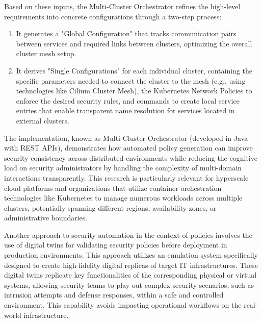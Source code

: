 Based on these inputs, the Multi-Cluster Orchestrator refines the high-level requirements into concrete configurations through a two-step process\cite{bringhenti_security_2023}:
\begin{enumerate}
    \item It generates a "Global Configuration" that tracks communication pairs between services and required links between clusters, optimizing the overall cluster mesh setup\cite{bringhenti_security_2023}.
    \item It derives "Single Configurations" for each individual cluster, containing the specific parameters needed to connect the cluster to the mesh (e.g., using technologies like Cilium Cluster Mesh), the Kubernetes Network Policies to enforce the desired security rules, and commands to create local service entries that enable transparent name resolution for services located in external clusters\cite{bringhenti_security_2023}.
\end{enumerate}

The implementation, known as Multi-Cluster Orchestrator (developed in Java with REST APIs), demonstrates how automated policy generation can improve security consistency across distributed environments while reducing the cognitive load on security administrators by handling the complexity of multi-domain interactions transparently\cite{bringhenti_security_2023}. This research is particularly relevant for hyperscale cloud platforms and organizations that utilize container orchestration technologies like Kubernetes to manage numerous workloads across multiple clusters, potentially spanning different regions, availability zones, or administrative boundaries\cite{bringhenti_security_2023}.

Another approach to security automation in the context of policies involves the use of digital twins for validating security policies before deployment in production environments\cite{hammar_digital_2023}. This approach utilizes an emulation system specifically designed to create high-fidelity digital replicas of target IT infrastructures\cite{hammar_digital_2023}. These digital twins replicate key functionalities of the corresponding physical or virtual systems, allowing security teams to play out complex security scenarios, such as intrusion attempts and defense responses, within a safe and controlled environment\cite{hammar_digital_2023}. This capability avoids impacting operational workflows on the real-world infrastructure\cite{hammar_digital_2023}.

